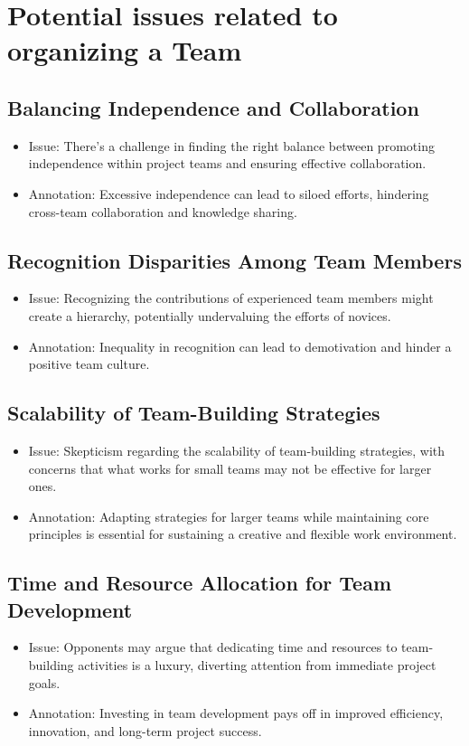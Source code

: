 \documentclass[a4paper, twoside]{article}
\begin{document}
\section{Potential issues related to organizing a Team}
\subsection{Balancing Independence and Collaboration}
\begin{itemize}
  \item{Issue}: There's a challenge in finding the right balance between promoting independence within project teams and ensuring effective collaboration.
  \item{Annotation}: Excessive independence can lead to siloed efforts, hindering cross-team collaboration and knowledge sharing.\cite{Tuckman1965}
\end{itemize}

\subsection{Recognition Disparities Among Team Members}
\begin{itemize}
  \item{Issue}: Recognizing the contributions of experienced team members might create a hierarchy, potentially undervaluing the efforts of novices.
  \item{Annotation}: Inequality in recognition can lead to demotivation and hinder a positive team culture.\cite{Deci2001}
\end{itemize}

\subsection{Scalability of Team-Building Strategies}
\begin{itemize}
  \item{Issue}: Skepticism regarding the scalability of team-building strategies, with concerns that what works for small teams may not be effective for larger ones.
  \item{Annotation}: Adapting strategies for larger teams while maintaining core principles is essential for sustaining a creative and flexible work environment.\cite{Hackman2002}
\end{itemize}

\subsection{Time and Resource Allocation for Team Development}
\begin{itemize}
  \item{Issue}: Opponents may argue that dedicating time and resources to team-building activities is a luxury, diverting attention from immediate project goals.
  \item{Annotation}: Investing in team development pays off in improved efficiency, innovation, and long-term project success.\cite{Katzenbach1993}
\end{itemize}
\end{document}
